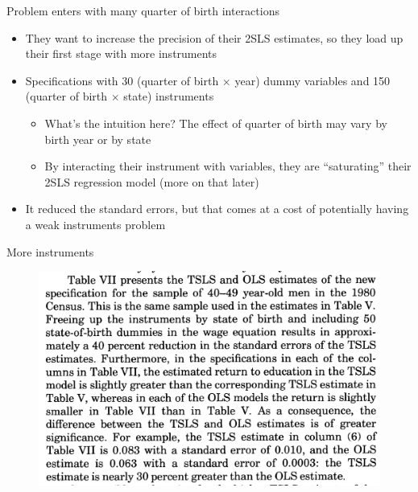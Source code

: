 \documentclass{beamer}
\begin{document}
\begin{frame}{Problem enters with many quarter of birth interactions}
	
	\begin{itemize}
	\item They want to increase the precision of their 2SLS estimates, so they load up their first stage with more instruments
	\item Specifications with 30 (quarter of birth $\times$ year) dummy variables and 150 (quarter of birth $\times$ state) instruments
		\begin{itemize}
		\item What's the intuition here?  The effect of quarter of birth may vary by birth year or by state
		\item By interacting their instrument with variables, they are ``saturating'' their 2SLS regression model (more on that later)
		\end{itemize}
	\item It reduced the standard errors, but that comes at a cost of potentially having a weak instruments problem
	\end{itemize}
	
\end{frame}




\begin{frame}{More instruments}

	\begin{figure}
	\includegraphics[scale=.25]{./lecture_includes/weak_qob2.png}
	\end{figure}
	

\end{frame}
\end{document}
